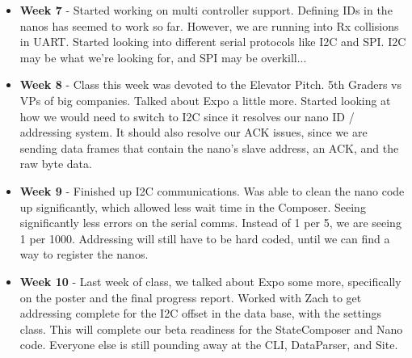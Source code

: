\documentclass[onecolumn, draftclsnofoot,10pt, compsoc]{IEEEtran}
\begin{document}
\begin{itemize}
					\item \textbf{Week 7} - Started working on multi controller support. Defining IDs in the nanos has seemed to work so far. However, we are running into Rx collisions in UART. Started looking into different serial protocols like I2C and SPI. I2C may be what we're looking for, and SPI may be overkill...
					\item \textbf{Week 8} - Class this week was devoted to the Elevator Pitch. 5th Graders vs VPs of big companies. Talked about Expo a little more. Started looking at how we would need to switch to I2C since it resolves our nano ID / addressing system. It should also resolve our ACK issues, since we are sending data frames that contain the nano's slave address, an ACK, and the raw byte data.
					\item \textbf{Week 9} - Finished up I2C communications. Was able to clean the nano code up significantly, which allowed less wait time in the Composer. Seeing significantly less errors on the serial comms. Instead of 1 per 5, we are seeing 1 per 1000. Addressing will still have to be hard coded, until we can find a way to register the nanos.
					\item \textbf{Week 10} - Last week of class, we talked about Expo some more, specifically on the poster and the final progress report. Worked with Zach to get addressing complete for the I2C offset in the data base, with the settings class. This will complete our beta readiness for the StateComposer and Nano code. Everyone else is still pounding away at the CLI, DataParser, and Site.
				\end{itemize}
\end{document}
